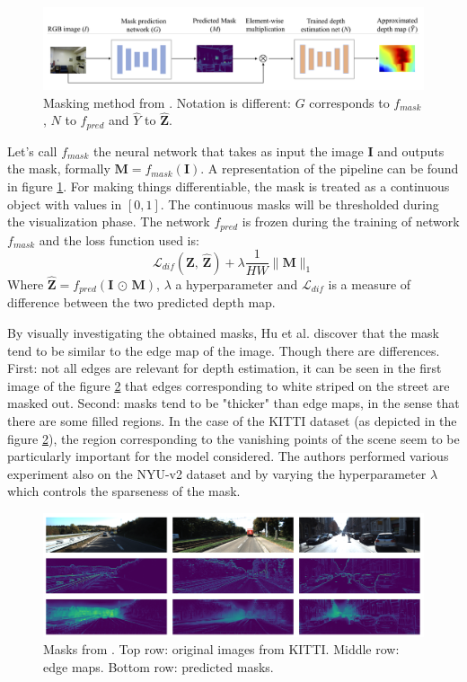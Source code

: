 \begin{figure}
    \centering
    \includegraphics[width=1.\textwidth]{figs/hu}
    \caption{
        Masking method from \cite{Hu}.
        Notation is different: $G$ corresponds to $f_{mask}$, $N$ to $f_{pred}$ and $\hat{Y}$ to $\hat{\mathbf{Z}}$.
        \label{fig:hu}
    }
\end{figure}

Let's call $f_{mask}$ the neural network that takes as input the image $\mathbf{I}$ and outputs the mask, formally $\mathbf{M} = f_{mask}(\mathbf{I})$.
A representation of the pipeline can be found in figure \ref{fig:hu}.
For making things differentiable, the mask is treated as a continuous object with values in $[0, 1]$.
The continuous masks will be thresholded during the visualization phase.
The network $f_{pred}$ is frozen during the training of network $f_{mask}$ and the loss function used is:
\[
    \mathcal{L}_{dif} (\mathbf{Z}, \, \hat{\mathbf{Z}}) +
    \lambda \frac{1}{HW} \big\| \mathbf{M} \big\|_{1}
\]
Where $\hat{\mathbf{Z}} = f_{pred}(\mathbf{I} \, \odot \, \mathbf{M})$, $\lambda$ a hyperparameter and $\mathcal{L}_{dif}$ is a measure of difference between the two predicted depth map.

By visually investigating the obtained masks, Hu et al. discover that the mask tend to be similar to the edge map of the image.
Though there are differences.
First: not all edges are relevant for depth estimation, it can be seen in the first image of the figure \ref{fig:pixel_relevance} that edges corresponding to white striped on the street are masked out.
Second: masks tend to be "thicker" than edge maps, in the sense that there are some filled regions.
In the case of the KITTI dataset (as depicted in the figure \ref{fig:pixel_relevance}), the region corresponding to the vanishing points of the scene seem to be particularly important for the model considered.
The authors performed various experiment also on the NYU-v2 dataset and by varying the hyperparameter $\lambda$ which controls the sparseness of the mask.

\begin{figure}
    \centering
    \includegraphics[width=1.\textwidth]{figs/pixel_relevance}
    \caption{
        Masks from \cite{Hu}.
        Top row: original images from KITTI.
        Middle row: edge maps.
        Bottom row: predicted masks.
        \label{fig:pixel_relevance}
    }
\end{figure}

